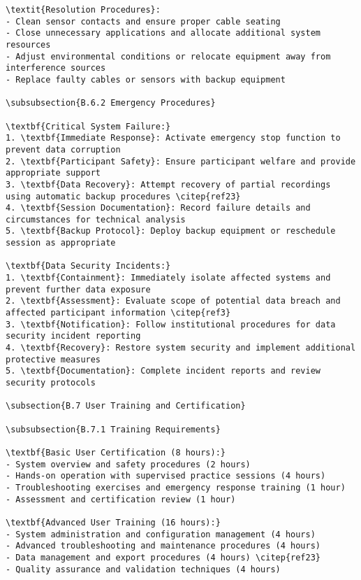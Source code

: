 \begin{verbatim}
\textit{Resolution Procedures}:
- Clean sensor contacts and ensure proper cable seating
- Close unnecessary applications and allocate additional system resources
- Adjust environmental conditions or relocate equipment away from interference sources
- Replace faulty cables or sensors with backup equipment

\subsubsection{B.6.2 Emergency Procedures}

\textbf{Critical System Failure:}
1. \textbf{Immediate Response}: Activate emergency stop function to prevent data corruption
2. \textbf{Participant Safety}: Ensure participant welfare and provide appropriate support
3. \textbf{Data Recovery}: Attempt recovery of partial recordings using automatic backup procedures \citep{ref23}
4. \textbf{Session Documentation}: Record failure details and circumstances for technical analysis
5. \textbf{Backup Protocol}: Deploy backup equipment or reschedule session as appropriate

\textbf{Data Security Incidents:}
1. \textbf{Containment}: Immediately isolate affected systems and prevent further data exposure
2. \textbf{Assessment}: Evaluate scope of potential data breach and affected participant information \citep{ref3}
3. \textbf{Notification}: Follow institutional procedures for data security incident reporting
4. \textbf{Recovery}: Restore system security and implement additional protective measures
5. \textbf{Documentation}: Complete incident reports and review security protocols

\subsection{B.7 User Training and Certification}

\subsubsection{B.7.1 Training Requirements}

\textbf{Basic User Certification (8 hours):}
- System overview and safety procedures (2 hours)
- Hands-on operation with supervised practice sessions (4 hours)
- Troubleshooting exercises and emergency response training (1 hour)
- Assessment and certification review (1 hour)

\textbf{Advanced User Training (16 hours):}
- System administration and configuration management (4 hours)
- Advanced troubleshooting and maintenance procedures (4 hours)
- Data management and export procedures (4 hours) \citep{ref23}
- Quality assurance and validation techniques (4 hours)


\end{verbatim}
